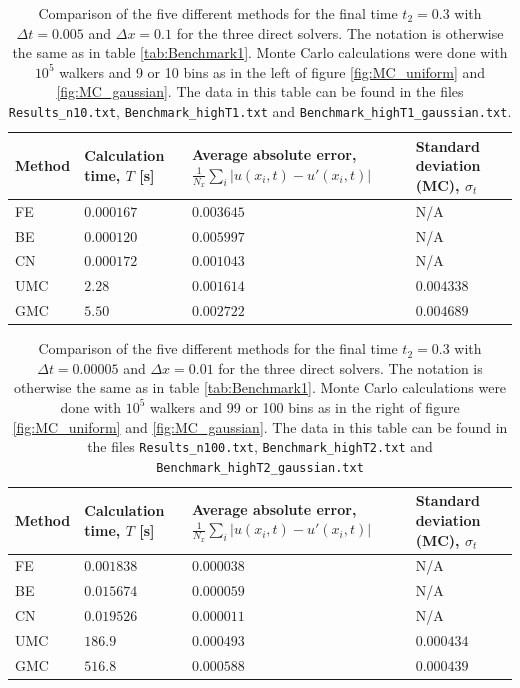 \documentclass[a4paper, 11pt, notitlepage,english]{article}
\begin{document}
\begin{table}[h!tb]
\begin{center}
\caption{Comparison of the five different methods for the final time $t_2 = 0.3$ with $\Delta t = 0.005$ and $\Delta x=0.1$ for the three direct solvers. The notation is otherwise the same as in table \ref{tab:Benchmark1}. Monte Carlo calculations were done with $10^{5}$ walkers and 9 or 10 bins as in the left of figure \ref{fig:MC_uniform} and \ref{fig:MC_gaussian}. The data in this table can be found in the files \texttt{Results\_n10.txt}, \texttt{Benchmark\_highT1.txt} and \texttt{Benchmark\_highT1\_gaussian.txt}.} 
\begin{tabular}{p{2cm} p{2cm} p{4cm} p{2.5cm}}
\toprule
Method & Calculation time, $T$ [s] & Average absolute error, $\frac{1}{N_x}\sum_i\lvert u(x_i,t) - u'(x_i,t) \rvert$ & Standard deviation (MC), $\sigma_t$ \\ \midrule
FE & $0.000167$ & $0.003645$ & N/A \\
BE & $0.000120$ & $0.005997$ & N/A \\
CN & $0.000172$ & $0.001043$ & N/A \\
UMC & $2.28$ & $0.001614$ & $0.004338$ \\
GMC & $5.50$ & $0.002722$ & $0.004689$ \\
\bottomrule
\end{tabular}
\label{tab:Benchmark3}
\end{center}
\end{table}

\begin{table}[h!tb]
\begin{center}
\caption{Comparison of the five different methods for the final time $t_2 = 0.3$ with $\Delta t = 0.00005$ and $\Delta x=0.01$ for the three direct solvers. The notation is otherwise the same as in table \ref{tab:Benchmark1}. Monte Carlo calculations were done with $10^{5}$ walkers and 99 or 100 bins as in the right of figure \ref{fig:MC_uniform} and \ref{fig:MC_gaussian}. The data in this table can be found in the files \texttt{Results\_n100.txt}, \texttt{Benchmark\_highT2.txt} and \texttt{Benchmark\_highT2\_gaussian.txt}} 
\begin{tabular}{p{2cm} p{2cm} p{4cm} p{2.5cm}}
\toprule
Method & Calculation time, $T$ [s] & Average absolute error, $\frac{1}{N_x}\sum_i\lvert u(x_i,t) - u'(x_i,t) \rvert$ & Standard deviation (MC), $\sigma_t$ \\ \midrule
FE & $0.001838$ & $0.000038$ & N/A \\
BE & $0.015674$ & $0.000059$ & N/A \\
CN & $0.019526$ & $0.000011$ & N/A \\
UMC & $186.9$ & $0.000493$ & $0.000434$ \\
GMC & $516.8$ & $0.000588$ & $0.000439$ \\
\bottomrule
\end{tabular}
\label{tab:Benchmark4}
\end{center}
\end{table}
\end{document}
